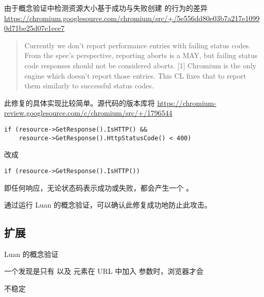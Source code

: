 由于概念验证中检测资源大小基于成功与失败创建  的行为的差异 \url{https://chromium.googlesource.com/chromium/src/+/5e556dd80e03b7a217e10990d71be25d07e1ece7}

\begin{quote}
    Currently we don't report performance entries with failing status codes.
    From the spec's perspective, reporting aborts is a MAY, but failing
    status code responses should not be considered aborts. [1]
    Chromium is the only engine which doesn't report those entries.
    This CL fixes that to report them similarly to successful status codes.
\end{quote}

此修复的具体实现比较简单。源代码的版本库将 \url{https://chromium-review.googlesource.com/c/chromium/src/+/1796544}

\begin{lstlisting}
if (resource->GetResponse().IsHTTP() &&
    resource->GetResponse().HttpStatusCode() < 400)
\end{lstlisting}

改成 

\begin{lstlisting}
if (resource->GetResponse().IsHTTP())
\end{lstlisting}


即任何响应，无论状态码表示成功或失败，都会产生一个 。


通过运行 Luan 的概念验证，可以确认此修复成功地防止此攻击。

\subsection{扩展}

Luan 的概念验证

一个发现是只有  以及  元素在 URL 中加入  参数时，浏览器才会

不稳定